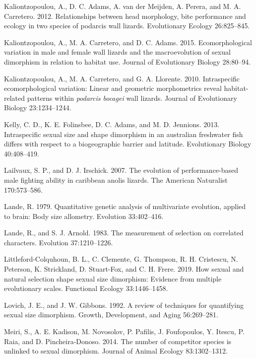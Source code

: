 \documentclass[]{article}
\begin{document}
\hypertarget{ref-Kaliontzopoulou2012}{}
Kaliontzopoulou, A., D. C. Adams, A. van der Meijden, A. Perera, and M.
A. Carretero. 2012. Relationships between head morphology, bite
performance and ecology in two species of podarcis wall lizards.
Evolutionary Ecology 26:825--845.

\hypertarget{ref-Kaliontzopoulou2015}{}
Kaliontzopoulou, A., M. A. Carretero, and D. C. Adams. 2015.
Ecomorphological variation in male and female wall lizards and the
macroevolution of sexual dimorphism in relation to habitat use. Journal
of Evolutionary Biology 28:80--94.

\hypertarget{ref-Kaliontzopoulou_et_al2010}{}
Kaliontzopoulou, A., M. A. Carretero, and G. A. Llorente. 2010.
Intraspecific ecomorphological variation: Linear and geometric
morphometrics reveal habitat-related patterns within \emph{podarcis
bocagei} wall lizards. Journal of Evolutionary Biology 23:1234--1244.

\hypertarget{ref-Kelly2013}{}
Kelly, C. D., K. E. Folinsbee, D. C. Adams, and M. D. Jennions. 2013.
Intraspecific sexual size and shape dimorphism in an australian
freshwater fish differs with respect to a biogeographic barrier and
latitude. Evolutionary Biology 40:408--419.

\hypertarget{ref-Lailvaux2007}{}
Lailvaux, S. P., and D. J. Irschick. 2007. The evolution of
performance-based male fighting ability in caribbean anolis lizards. The
American Naturalist 170:573--586.

\hypertarget{ref-Lande1979}{}
Lande, R. 1979. Quantitative genetic analysis of multivariate evolution,
applied to brain: Body size allometry. Evolution 33:402--416.

\hypertarget{ref-LandeArnold1983}{}
Lande, R., and S. J. Arnold. 1983. The measurement of selection on
correlated characters. Evolution 37:1210--1226.

\hypertarget{ref-Littleford-Colquhoun2019}{}
Littleford-Colquhoun, B. L., C. Clemente, G. Thompson, R. H. Cristescu,
N. Peterson, K. Strickland, D. Stuart-Fox, and C. H. Frere. 2019. How
sexual and natural selection shape sexual size dimorphism: Evidence from
multiple evolutionary scales. Functional Ecology 33:1446--1458.

\hypertarget{ref-Lovich1992}{}
Lovich, J. E., and J. W. Gibbons. 1992. A review of techniques for
quantifying sexual size dimorphism. Growth, Development, and Aging
56:269--281.

\hypertarget{ref-Meiri2014}{}
Meiri, S., A. E. Kadison, M. Novosolov, P. Pafilis, J. Foufopoulos, Y.
Itescu, P. Raia, and D. Pincheira-Donoso. 2014. The number of competitor
species is unlinked to sexual dimorphism. Journal of Animal Ecology
83:1302--1312.
\end{document}
